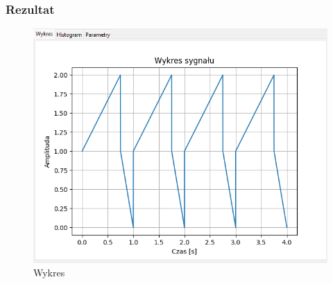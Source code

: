 \documentclass{article}
\begin{document}
\subsubsection{Rezultat}
\begin{figure}[h!]
    \centering
    \includegraphics[width=\textwidth]{img/add/wykres.png}
    \caption{Wykres}
\end{figure}
\end{document}
